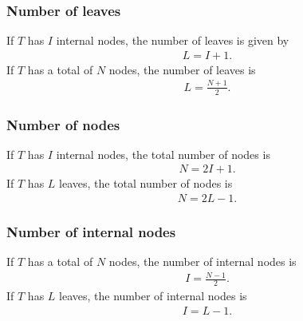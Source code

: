 \documentclass{report}
\begin{document}
\subsubsection{Number of leaves}
\bigbreak \noindent 
If $T$ has $I$ internal nodes, the number of leaves is given by
\begin{align*}
   L = I + 1 
.\end{align*}
\bigbreak \noindent 
If $T$ has a total of $N$ nodes, the number of leaves is 
\begin{align*}
    L = \frac{N+1}{2}
.\end{align*}
\pagebreak 
\subsubsection{Number of nodes}
\bigbreak \noindent 
If $T$ has $I$ internal nodes, the total number of nodes is 
\begin{align*}
    N = 2I + 1
.\end{align*}
\bigbreak \noindent 
If $T$ has $L$ leaves, the total number of nodes is 
\begin{align*}
    N = 2L - 1
.\end{align*}
\bigbreak \noindent 
\subsubsection{Number of internal nodes}
\bigbreak \noindent 
If $T$ has a total of $N$ nodes, the number of internal nodes is 
\begin{align*}
    I = \frac{N-1}{2}
.\end{align*}
\bigbreak \noindent 
If $T$ has $L$ leaves, the number of internal nodes is 
\begin{align*}
    I = L - 1
.\end{align*}

\pagebreak 
\end{document}
